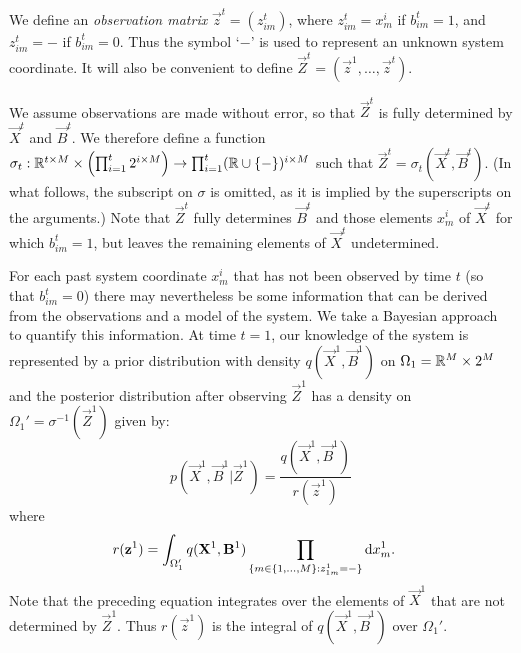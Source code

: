We define an {\em observation matrix} $\vec{z}^t = (z^t_{im})$, where $z^t_{im} = x^i_m$ if $b^t_{im} = 1$, and $z^t_{im} = -$ if $b^t_{im} = 0$. Thus the symbol `$-$' is used to represent an unknown system coordinate. It will also be convenient to define $\vec{Z}^t = (\vec{z}^1,\ldots,\vec{z}^t)$. 

We assume observations are made without error, so that $\vec{Z}^t$ is fully determined by $\vec{X}^t$ and $\vec{B}^t$. We therefore define a function $\sigma_t: \mathbb R^{t \times M} \times \left( \prod_{i=1}^t 2^{i \times M} \right) \rightarrow \prod_{i=1}^t (\mathbb R \cup \{ - \})^{i \times M}$ such that $\vec{Z}^t = \sigma_t(\vec{X}^t, \vec{B}^t)$. (In what follows, the subscript on $\sigma$ is omitted, as it is implied by the superscripts on the arguments.) Note that $\vec{Z}^t$ fully determines $\vec{B}^t$ and those elements $x_m^i$ of $\vec{X}^t$ for which $b_{im}^t = 1$, but leaves the remaining elements of $\vec{X}^t$ undetermined.

For each past system coordinate $x^i_m$ that has not been observed by time $t$ (so that $b^t_{im} = 0$) there may nevertheless be some information that can be derived from the observations and a model of the system. We take a Bayesian approach to quantify this information. At time $t=1$, our knowledge of the system is represented by a prior distribution with density $q(\vec{X}^1, \vec{B}^1)$ on $\Omega_1 = \mathbb R^M \times 2^M$ and the posterior distribution after observing $\vec{Z}^1$ has a density on $\Omega_1' = \sigma^{-1}(\vec{Z}^1)$ given by:
\begin{equation*}
    p(\vec{X}^1, \vec{B}^1 |\vec{Z}^1) =
        \frac{q(\vec{X}^1, \vec{B}^1)}
        {r(\vec{z}^1)} 
\end{equation*}
where
\begin{align*}
    r(\mathbf{z}^1)  &= \int_{\Omega_1'} q(\mathbf{X}^1, \mathbf{B}^1) \prod_{ \{m \in \{1, \ldots, M \} : z^1_{1m} = - \} } \operatorname{d}\!{x}^1_m.
\end{align*}
Note that the preceding equation integrates over the elements of $\vec{X}^1$ that are not determined by $\vec{Z}^1$. Thus $r(\vec{z}^1)$ is the integral of $q(\vec{X}^1, \vec{B}^1)$ over $\Omega_1'$. 

